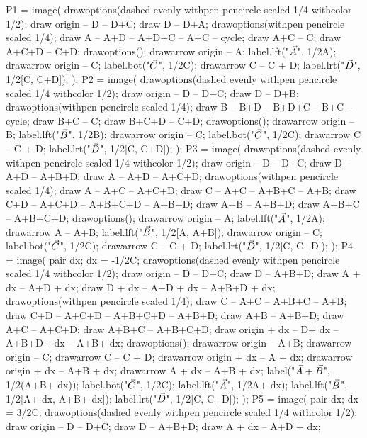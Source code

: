 \documentclass[oneside]{scrbook}
\begin{document}
P1 = image(
    drawoptions(dashed evenly withpen pencircle scaled 1/4 withcolor 1/2);
    draw origin -- D -- D+C;  draw D -- D+A;
    drawoptions(withpen pencircle scaled 1/4);
    draw A -- A+D -- A+D+C -- A+C -- cycle;
    draw A+C -- C;
    draw A+C+D -- C+D;
    drawoptions();
    drawarrow origin -- A; label.lft("$\vec{A}$", 1/2A);
    drawarrow origin -- C; label.bot("$\vec{C}$", 1/2C);
    drawarrow C -- C + D; label.lrt("$\vec{D}$", 1/2[C, C+D]);
);
P2 = image(
    drawoptions(dashed evenly withpen pencircle scaled 1/4 withcolor 1/2);
    draw origin -- D -- D+C;  draw D -- D+B;
    drawoptions(withpen pencircle scaled 1/4);
    draw B -- B+D -- B+D+C -- B+C -- cycle;
    draw B+C -- C;
    draw B+C+D -- C+D;
    drawoptions();
    drawarrow origin -- B; label.lft("$\vec{B}$", 1/2B);
    drawarrow origin -- C; label.bot("$\vec{C}$", 1/2C);
    drawarrow C -- C + D; label.lrt("$\vec{D}$", 1/2[C, C+D]);
);
P3 = image(
    drawoptions(dashed evenly withpen pencircle scaled 1/4 withcolor 1/2);
    draw origin -- D -- D+C;  
    draw D -- A+D -- A+B+D;
    draw A -- A+D -- A+C+D;
    drawoptions(withpen pencircle scaled 1/4);
    draw A -- A+C -- A+C+D;
    draw C -- A+C -- A+B+C -- A+B;
    draw C+D -- A+C+D -- A+B+C+D -- A+B+D;
    draw A+B -- A+B+D;
    draw A+B+C -- A+B+C+D;
    drawoptions();
    drawarrow origin -- A; label.lft("$\vec{A}$", 1/2A);
    drawarrow A -- A+B; label.lft("$\vec{B}$", 1/2[A, A+B]);
    drawarrow origin -- C; label.bot("$\vec{C}$", 1/2C);
    drawarrow C -- C + D; label.lrt("$\vec{D}$", 1/2[C, C+D]);
);
P4 = image(
    pair dx; dx = -1/2C;
    drawoptions(dashed evenly withpen pencircle scaled 1/4 withcolor 1/2);
    draw origin -- D -- D+C;  
    draw D -- A+B+D;
    draw A + dx -- A+D + dx;
    draw D + dx -- A+D + dx -- A+B+D + dx;
    drawoptions(withpen pencircle scaled 1/4);
    draw C -- A+C -- A+B+C -- A+B;
    draw C+D -- A+C+D -- A+B+C+D -- A+B+D;
    draw A+B -- A+B+D;
    draw A+C -- A+C+D;
    draw A+B+C -- A+B+C+D;
    draw origin + dx -- D+ dx -- A+B+D+ dx -- A+B+ dx;
    drawoptions();
    drawarrow origin -- A+B;
    drawarrow origin -- C;
    drawarrow C -- C + D; 
    drawarrow origin + dx -- A + dx; 
    drawarrow origin + dx -- A+B + dx; 
    drawarrow A + dx -- A+B + dx;
    label("$\vec{A}+\vec{B}$", 1/2(A+B+ dx));
    label.bot("$\vec{C}$", 1/2C);
    label.lft("$\vec{A}$", 1/2A+ dx);
    label.lft("$\vec{B}$", 1/2[A+ dx, A+B+ dx]);
    label.lrt("$\vec{D}$", 1/2[C, C+D]);
);
P5 = image(
    pair dx; dx = 3/2C;
    drawoptions(dashed evenly withpen pencircle scaled 1/4 withcolor 1/2);
    draw origin -- D -- D+C;  
    draw D -- A+B+D;
    draw A + dx -- A+D + dx;
\end{document}
